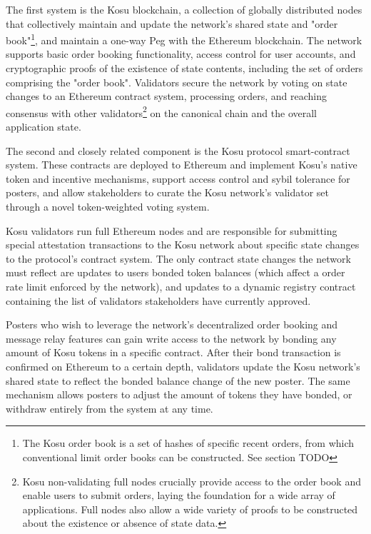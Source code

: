 \documentclass[10pt]{article}
\begin{document}
The first system is the Kosu blockchain, a collection of globally distributed nodes that collectively maintain and update the network’s shared state and "order book"\footnote{The Kosu order book is a set of hashes of specific recent orders, from which conventional limit order books can be constructed. See section TODO}, and maintain a one-way Peg with the Ethereum blockchain. The network supports basic order booking functionality, access control for user accounts, and cryptographic proofs of the existence of state contents, including the set of orders comprising the "order book". Validators secure the network by voting on state changes to an Ethereum contract system, processing orders, and reaching consensus with other validators\footnote{Kosu non-validating full nodes crucially provide access to the order book and enable users to submit orders, laying the foundation for a wide array of applications. Full nodes also allow a wide variety of proofs to be constructed about the existence or absence of state data.} on the canonical chain and the overall application state. 
\medskip

The second and closely related component is the Kosu protocol smart-contract system. These contracts are deployed to Ethereum and implement Kosu’s native token and incentive mechanisms, support access control and sybil tolerance for posters, and allow stakeholders to curate the Kosu network’s validator set through a novel token-weighted voting system.
\medskip

Kosu validators run full Ethereum nodes and are responsible for submitting special attestation transactions to the Kosu network about specific state changes to the protocol’s contract system. The only contract state changes the network must reflect are updates to users bonded token balances (which affect a order rate limit enforced by the network), and updates to a dynamic registry contract containing the list of validators stakeholders have currently approved. 
\medskip

Posters who wish to leverage the network’s decentralized order booking and message relay features can gain write access to the network by bonding any amount of Kosu tokens in a specific contract. After their bond transaction is confirmed on Ethereum to a certain depth, validators update the Kosu network's shared state to reflect the bonded balance change of the new poster. The same mechanism allows posters to adjust the amount of tokens they have bonded, or withdraw entirely from the system at any time.
\medskip
\end{document}
